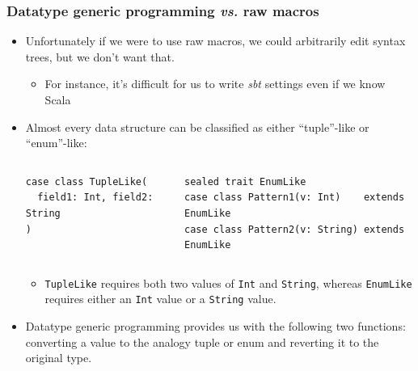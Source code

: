 \begin{frame}[fragile]
  \frametitle{Datatype generic programming \textit{vs.} raw macros}

  \pause
  \begin{itemize}
    \item<+-> Unfortunately if we were to use raw macros, we could arbitrarily edit syntax trees,
    but we don't want that.
    \begin{itemize}
      \item For instance, it's difficult for us to write \emph{sbt} settings even if we know Scala
    \end{itemize}

    \item<+-> Almost every data structure can be classified as either ``tuple''-like or ``enum''-like:
    \begin{columns}
      \begin{column}{0.32\textwidth}
\begin{lstlisting}[style=scala]
case class TupleLike(
  field1: Int, field2: String
)
\end{lstlisting}
      \end{column}
      \begin{column}{0.5\textwidth}
\begin{lstlisting}[style=scala]
sealed trait EnumLike
case class Pattern1(v: Int)    extends EnumLike
case class Pattern2(v: String) extends EnumLike
\end{lstlisting}
      \end{column}
    \end{columns}
    \begin{itemize}
      \item \lstinline|TupleLike| requires both two values of \lstinline|Int| and \lstinline|String|,
      whereas \lstinline|EnumLike| requires either an \lstinline|Int| value or a \lstinline|String| value.
    \end{itemize}

    \item<+-> Datatype generic programming provides us with the following two functions: 
       converting a value to the analogy tuple or enum
       and reverting it to the original type.
  \end{itemize}

\end{frame}
